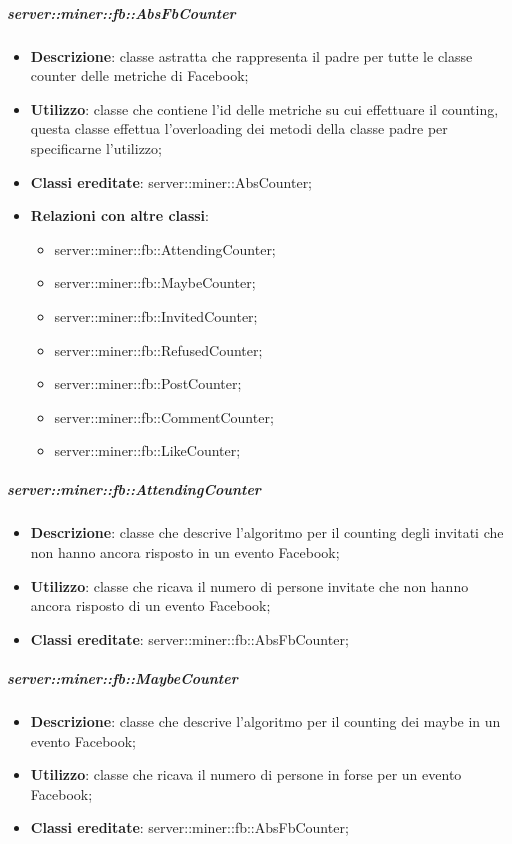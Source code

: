 		\subparagraph{server::miner::fb::AbsFbCounter} %
		\label{subp:server_miner_fb_AbsFbCounter}
			\begin{itemize}
				\item \textbf{Descrizione}: classe astratta che rappresenta il padre per tutte le classe counter delle metriche di Facebook;
				\item \textbf{Utilizzo}: classe che contiene l'id delle metriche su cui effettuare il counting, questa classe effettua l'overloading dei metodi della classe padre per specificarne l'utilizzo;
				\item \textbf{Classi ereditate}: server::miner::AbsCounter;
				\item \textbf{Relazioni con altre classi}:
					\begin{itemize}
						\item server::miner::fb::AttendingCounter;
						\item server::miner::fb::MaybeCounter;
						\item server::miner::fb::InvitedCounter;
						\item server::miner::fb::RefusedCounter;
						\item server::miner::fb::PostCounter;
						\item server::miner::fb::CommentCounter;
						\item server::miner::fb::LikeCounter;
					\end{itemize}
			\end{itemize}

		\subparagraph{server::miner::fb::AttendingCounter} %
		\label{subp:server_miner_fb_AttendingCounter}
			\begin{itemize}
				\item \textbf{Descrizione}: classe che descrive l'algoritmo per il counting degli invitati che non hanno ancora risposto in un evento Facebook;
				\item \textbf{Utilizzo}: classe che ricava il numero di persone invitate che non hanno ancora risposto di un evento Facebook;
				\item \textbf{Classi ereditate}: server::miner::fb::AbsFbCounter;
			\end{itemize}

		\subparagraph{server::miner::fb::MaybeCounter} %
		\label{subp:server_miner_fb_MaybeCounter}
			\begin{itemize}
				\item \textbf{Descrizione}: classe che descrive l'algoritmo per il counting dei maybe in un evento Facebook;
				\item \textbf{Utilizzo}: classe che ricava il numero di persone in forse per un evento Facebook;
				\item \textbf{Classi ereditate}: server::miner::fb::AbsFbCounter;
			\end{itemize}

